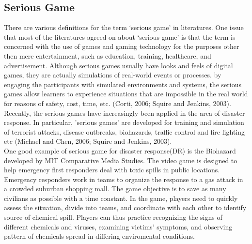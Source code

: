 %

\subsection{Serious Game}

There are various definitions for the term `serious game' in literatures. One issue that most of the literatures agreed on about `serious game' is that the term is concerned with the use of games and gaming technology for the purposes other then mere entertainment, such as education, training, healthcare, and advertisement. Although serious games usually have looks and feels of digital games, they are actually simulations of real-world events or processes. by engaging the participants with simulated environments and systems, the serious games allow learners to experience situations that are impossible in the real world for reasons of safety, cost, time, etc. (Corti, 2006; Squire and Jenkins, 2003). \\

Recently, the serious games have increasingly been applied in the area of disaster response. In particular, 'serious games' are developed for training and simulation of terrorist attacks, disease outbreaks, biohazards, traffic control and fire fighting etc (Michael and Chen, 2006; Squire and Jenkins, 2003). \\

One good example of serious game for disaster response(DR) is the Biohazard developed by MIT Comparative Media Studies. The video game is designed to help emergency first responders deal with toxic spills in public locations. Emergency responders work in teams to organize the response to a gas attack in a crowded suburban shopping mall. The game objective is to save as many civilians as possible with a time constant. In the game,  players need to quickly assess the situation, divide into teams, and coordinate with each other to identify source of chemical spill. Players can thus practice recognizing the signs of different chemicals and viruses, examining victims' symptoms, and observing pattern of chemicals spread in differing enviromental conditions.\\

